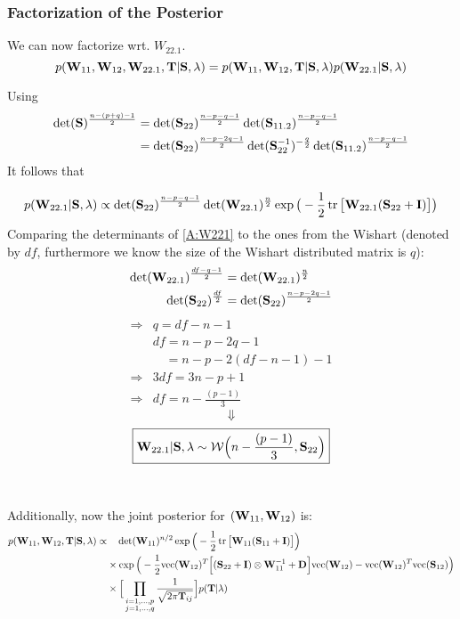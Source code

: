 \subsubsection{Factorization of the Posterior}
\label{A:factorized_post}
We can now factorize wrt. $W_{22.1}$.
$$ p(\mathbf{W}_{11}, \mathbf{W}_{12}, \mathbf{W}_{22.1}, \mathbf{T} | \mathbf{S}, \lambda)
= p(\mathbf{W}_{11}, \mathbf{W}_{12}, \mathbf{T} | \mathbf{S}, \lambda) p(\mathbf{W}_{22.1} | \mathbf{S}, \lambda) 
$$

Using
\begin{align*}
\det(\mathbf{S})^{\frac{n-(p+q)-1}{2}} &= \det(\mathbf{S}_{22})^{\frac{n-p-q-1}{2}} \det(\mathbf{S}_{11.2})^{\frac{n-p-q-1}{2}}
\\
&=
\det(\mathbf{S}_{22})^{\frac{n-p-2q-1}{2}}\det(\mathbf{S}_{22}^{-1})^{-\frac{q}{2}} \det(\mathbf{S}_{11.2})^{\frac{n-p-q-1}{2}}
\end{align*}
It follows that

\begin{align}
\label{A:W221}
p(\mathbf{W}_{22.1}|\mathbf{S}, \lambda)
\propto 
\det(\mathbf{S}_{22})^{\frac{n-p-q-1}{2}}
\det(\mathbf{W}_{22.1})^{\frac{n}{2}}
\exp\big(
	-\frac{1}{2} \operatorname{tr} \big[
		\mathbf{W}_{22.1} (\mathbf{S}_{22}+\mathbf{I})
	\big]
\big)
\end{align}
Comparing the determinants of \autoref{A:W221} to the ones from the Wishart (denoted by $df$, furthermore we know the size of the Wishart distributed matrix is $q$):
\begin{align*}
\det(\mathbf{W}_{22.1})^{\frac{df-q-1}{2}} &= \det(\mathbf{W}_{22.1})^{\frac{n}{2}}
\\
\det(\mathbf{S}_{22})^{\frac{df}{2}} &= \det(\mathbf{S}_{22})^{\frac{n-p-2q-1}{2}}
\end{align*}
\begin{align*}
\Rightarrow&
q = df - n - 1
\\
&df = n -p-2q-1
\\
&\quad= n-p-2(df-n-1)-1
\\
\Rightarrow&
3df = 3n - p + 1
\\
\Rightarrow&
df = n- \frac{(p-1)}{3}
\end{align*}
$$\Downarrow$$
\begin{equation}
\boxed{
	\mathbf{W}_{22.1}|\mathbf{S}, \lambda \sim \mathcal{W}\Big(n-\frac{(p-1)}{3}, \mathbf{S}_{22} \Big)
	}
\end{equation}
\\
\\

Additionally, now the joint posterior for $(\mathbf{W}_{11}, \mathbf{W}_{12})$ is:
\begin{align}
p(\mathbf{W}_{11}, \mathbf{W}_{12}, \mathbf{T} | \mathbf{S}, \lambda)
\propto& \quad
\det(\mathbf{W}_{11})^{n/2} \exp \Big( - \frac{1}{2} \operatorname{tr}\big[ \mathbf{W}_{11} (\mathbf{S}_{11} + \mathbf{I}) \big]\Big)
\label{marginal_joint}\\
&\times \exp\Big(
-\frac{1}{2}\text{vec}(\mathbf{W}_{12})^T \Big[
(\mathbf{S}_{22} + \mathbf{I}) \otimes \mathbf{W}_{11}^{-1} +\mathbf{D}\Big]
\text{vec}(\mathbf{W}_{12})
- \text{vec}(\mathbf{W}_{12})^T \text{vec}(\mathbf{S}_{12})
\Big)
\nonumber \\
&\times \Big[\prod_{{\substack{i=1,\dots,p\\j=1,\dots,q}} }  \frac{1}{\sqrt{2\pi \mathbf{T}_{ij}}}\Big]
p(\mathbf{T}|\lambda)
\nonumber
\end{align}
